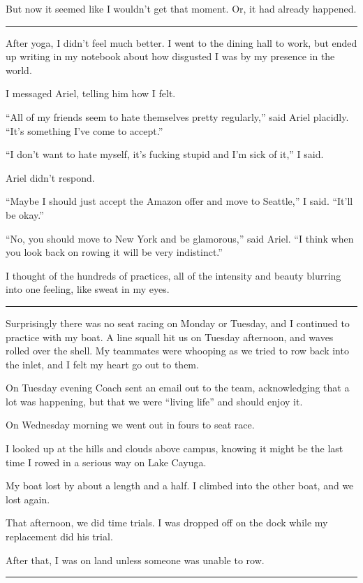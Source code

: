 But now it seemed like I wouldn't get that moment.  Or, it had already happened.

\plainfancybreak{12pt}{2}{}

After yoga, I didn't feel much better.  I went to the dining hall to work, but
ended up writing in my notebook about how disgusted I was by my presence in the
world.

I messaged Ariel, telling him how I felt.

``All of my friends seem to hate themselves pretty regularly,'' said Ariel
placidly.  ``It's something I've come to accept.''

``I don't want to hate myself, it's fucking stupid and I'm sick of it,'' I said.  

Ariel didn't respond.

``Maybe I should just accept the Amazon offer and move to Seattle,'' I said.
``It'll be okay.''

``No, you should move to New York and be glamorous,'' said Ariel.  ``I think
when you look back on rowing it will be very indistinct.'' 

I thought of the hundreds of practices, all of the intensity and beauty blurring
into one feeling, like sweat in my eyes.

\plainfancybreak{12pt}{2}{}

Surprisingly there was no seat racing on Monday or Tuesday, and I continued to
practice with my boat.  A line squall hit us on Tuesday afternoon, and waves
rolled over the shell.  My teammates were whooping as we tried to row back into
the inlet, and I felt my heart go out to them.

On Tuesday evening Coach sent an email out to the team, acknowledging that a lot
was happening, but that we were ``living life'' and should enjoy it.

On Wednesday morning we went out in fours to seat race.

I looked up at the hills and clouds above campus, knowing it might be the last
time I rowed in a serious way on Lake Cayuga.

My boat lost by about a length and a half.  I climbed into the other boat, and
we lost again.

That afternoon, we did time trials.  I was dropped off on the dock while my
replacement did his trial. 

After that, I was on land unless someone was unable to row.
 
\plainfancybreak{12pt}{2}{}

